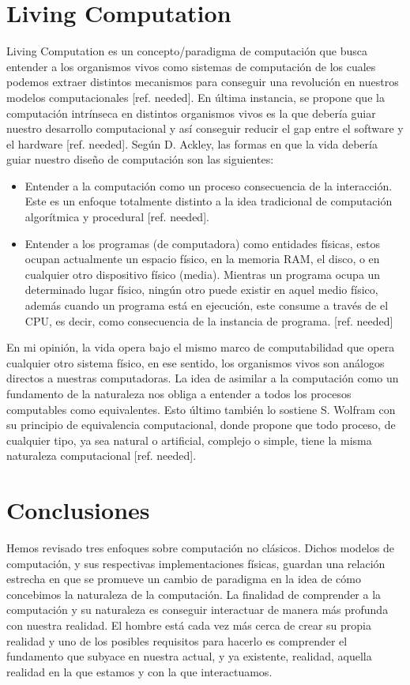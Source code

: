 \documentclass[conference]{IEEEtran}
\begin{document}
\section{Living Computation}
Living Computation es un concepto/paradigma de computación que busca entender a los organismos vivos como sistemas de computación de los cuales podemos extraer distintos mecanismos para conseguir una revolución en nuestros modelos computacionales [ref. needed]. En última instancia, se propone que la computación intrínseca en distintos organismos vivos es la que debería guiar nuestro desarrollo computacional y así conseguir reducir el gap entre el software y el hardware [ref. needed]. Según D. Ackley, las formas en que la vida debería guiar nuestro diseño de computación son las siguientes:

\begin{itemize}
\item Entender a la computación como un proceso consecuencia de la interacción. Este es un enfoque totalmente distinto a la idea tradicional de computación algorítmica y procedural [ref. needed].
\item Entender a los programas (de computadora) como entidades físicas, estos ocupan actualmente un espacio físico, en la memoria RAM, el disco, o en cualquier otro dispositivo físico (media). Mientras un programa ocupa un determinado lugar físico, ningún otro puede existir en aquel medio físico, además cuando un programa está en ejecución, este consume a través de el CPU, es decir, como consecuencia de la instancia de programa. [ref. needed]
\end{itemize}

En mi opinión, la vida opera bajo el mismo marco de computabilidad que opera cualquier otro sistema físico, en ese sentido, los organismos vivos son análogos directos a nuestras computadoras. La idea de asimilar a la computación como un fundamento de la naturaleza nos obliga a entender a todos los procesos computables como equivalentes. Esto último también lo sostiene S. Wolfram con su principio de equivalencia computacional, donde propone que todo proceso, de cualquier tipo, ya sea natural o artificial, complejo o simple, tiene la misma naturaleza computacional [ref. needed].  

\section{Conclusiones}
Hemos revisado tres enfoques sobre computación no clásicos. Dichos modelos de computación, y sus respectivas implementaciones físicas, guardan una relación estrecha en que se promueve un cambio de paradigma en la idea de cómo concebimos la naturaleza de la computación. La finalidad de comprender a la computación y su naturaleza es conseguir interactuar de manera más profunda con nuestra realidad. El hombre  está cada vez más cerca de crear su propia realidad y uno de los posibles requisitos para hacerlo es comprender el fundamento que subyace en nuestra actual, y ya existente, realidad, aquella realidad en la que estamos y con la que interactuamos.
\end{document}
